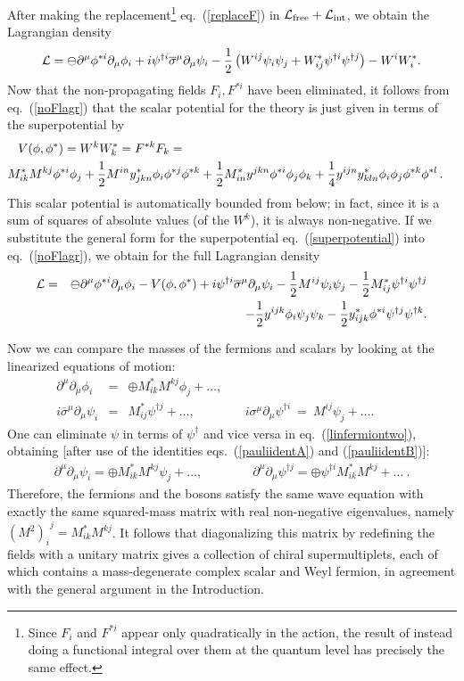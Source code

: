 \documentclass[11pt]{article}
\def\BDpos{}
\def\BDneg{-}
\def\BDpos{-}
\def\BDneg{}
\def\BDpos{\oplus}
\def\BDneg{\ominus}
\def\BDpos{\ominus}
\def\BDneg{\oplus}
\def\beq{\begin{eqnarray}}
\def\eeq{\end{eqnarray}}
\def\lagr{{\cal L}}
\def\sigmabar{\overline\sigma}
\def\half{{1\over 2}}
\begin{document}
After making the replacement\footnote{Since $F_i$ and $F^{*i}$ appear only
quadratically in the action, the result of instead doing a functional
integral over them at the quantum level has precisely the same effect.}
eq.~(\ref{replaceF}) in $\lagr_{\rm free} + \lagr_{\rm int}$, we obtain
the Lagrangian density
\beq
\lagr = \BDpos\partial^\mu \phi^{*i} \partial_\mu \phi_i
+ i \psi^{\dagger i} \sigmabar^\mu \partial_\mu \psi_i
-\half \left (W^{ij} \psi_i \psi_j  + W^{*}_{ij} \psi^{\dagger i}
\psi^{\dagger j} \right )
- W^i W^{*}_i.
\label{noFlagr}
\eeq
Now that the non-propagating fields $F_i, F^{*i}$ have been eliminated, it
follows from eq.~(\ref{noFlagr}) that the scalar potential for the theory
is just given in terms of the superpotential by
\beq
V(\phi,\phi^*) = W^k W_k^* = F^{*k} F_k = 
\phantom{xxxxxxxxxxxxxxxxxxxxxxxxxxxxxxxxxxxx.}
&&
\nonumber
\\ 
M^*_{ik} M^{kj} \phi^{*i} \phi_{j}
+{1\over 2} M^{in} y_{jkn}^* \phi_i \phi^{*j} \phi^{*k}
+{1\over 2} M_{in}^{*} y^{jkn} \phi^{*i} \phi_j \phi_k
+{1\over 4} y^{ijn} y_{kln}^{*} \phi_i \phi_j \phi^{*k} \phi^{*l}
\, .
&&
\label{ordpot}
\eeq
This scalar potential is automatically bounded from below; in fact, since
it is a sum of squares of absolute values (of the $W^k$), it is always
non-negative. If we substitute the general form for the superpotential
eq.~(\ref{superpotential}) into eq.~(\ref{noFlagr}), we obtain for the
full Lagrangian density
\beq
\lagr &=&
\BDpos \partial^\mu \phi^{*i} \partial_\mu \phi_i - V(\phi,\phi^*)
+ i \psi^{\dagger i} \sigmabar^\mu \partial_\mu \psi_i
- \half M^{ij} \psi_i\psi_j - \half M_{ij}^{*} \psi^{\dagger i}
\psi^{\dagger j}
\nonumber\\
&& - \half y^{ijk} \phi_i \psi_j \psi_k - \half y_{ijk}^{*} \phi^{*i}
\psi^{\dagger j} \psi^{\dagger k}.
\label{lagrchiral}
\eeq

Now we can compare the masses of the fermions and scalars by looking at
the linearized equations of motion:
\beq
\partial^\mu\partial_\mu \phi_i &=& 
\BDneg 
M_{ik}^{*} M^{kj} \phi_j
+ \ldots,\\
i\sigmabar^\mu\partial_\mu\psi_i &=&  
M_{ij}^{*} \psi^{\dagger j}+\ldots,
\qquad\qquad
i\sigma^\mu\partial_\mu\psi^{\dagger i} \>=\> 
M^{ij} \psi_j +\ldots .\qquad\>\>\>{}
\label{linfermiontwo}
\eeq
One can eliminate $\psi$ in terms of $\psi^\dagger$ and vice versa in
eq.~(\ref{linfermiontwo}), obtaining [after use of the identities
eqs.~(\ref{pauliidentA}) and (\ref{pauliidentB})]:
\beq
\partial^\mu\partial_\mu \psi_i =   
\BDneg M_{ik}^{*} M^{kj} \psi_j
+ \ldots ,\qquad\qquad
\partial^\mu\partial_\mu \psi^{\dagger j} =
\BDneg \psi^{\dagger i} M_{ik}^{*} M^{kj}+\ldots
\> .
\eeq
Therefore, the fermions and the bosons satisfy the same wave equation with
exactly the same squared-mass matrix with real non-negative eigenvalues,
namely ${(M^2)_i}^j = M_{ik}^{*} M^{kj}$. It follows that diagonalizing
this matrix by redefining the fields with a unitary matrix gives a
collection of chiral supermultiplets, each of which contains a
mass-degenerate complex scalar and Weyl fermion, in agreement with the
general argument in the Introduction. 
\end{document}
